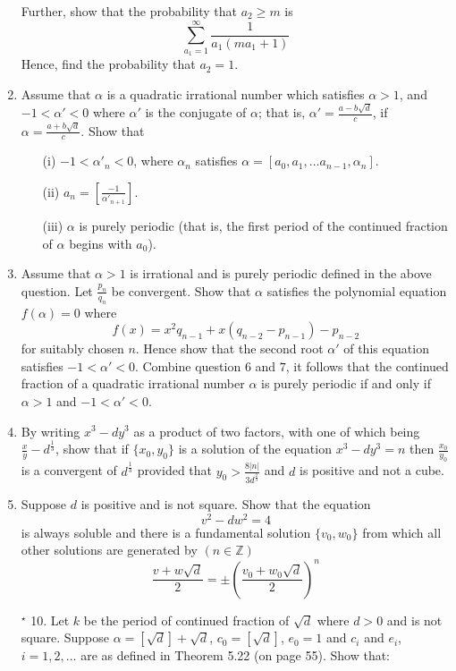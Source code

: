 \begin{enumerate}
     Further, show that the probability that $a_2 \ge m$ is
     $$\sum_{a_1=1}^{\infty} \frac{1}{a_1(ma_1+1)}$$
     Hence, find the probability that $a_2=1$.
\item Assume that $\alpha$ is a quadratic irrational number which satisfies $\alpha>1$, and
     $-1<\alpha'<0$ where $\alpha'$ is the conjugate of $\alpha$; that is, $\alpha'=\frac{a-b\sqrt{d}}{c}$, if $\alpha=\frac{a+b\sqrt{d}}{c}$. Show that
     \begin{enumerate}
     \item[(i)] $-1<\alpha'_{n}<0$, where $\alpha_n$ satisfies
     $\alpha=[a_0,a_1,\ldots a_{n-1},\alpha_n]$.
     \item[(ii)] $a_n=[\frac{-1}{\alpha'_{n+1}}]$.
     \item[(iii)] $\alpha$ is purely periodic (that is, the first period of the continued fraction of $\alpha$ begins with $a_0$).
     \end{enumerate}
\item Assume that $\alpha>1$ is irrational and is purely periodic defined in the above question.
     Let $\frac{p_n}{q_n}$ be convergent.
     Show that $\alpha$ satisfies the polynomial equation $f(\alpha)=0$ where
     $$f(x)=x^2q_{n-1}+x(q_{n-2}-p_{n-1})-p_{n-2}$$
     for suitably chosen $n$. Hence show that the second root $\alpha'$ of this equation
     satisfies $-1<\alpha'<0$.
     Combine question $6$ and $7$, it follows that the continued fraction of a quadratic irrational
     number $\alpha$ is purely periodic if and only if $\alpha>1$ and $-1<\alpha'<0$.
\item By writing $x^3-dy^3$ as a product of two factors, with one of which being
     $\frac{x}{y}-d^{\frac{1}{3}}$, show that if $\{x_0,y_0\}$ is a solution of the equation
     $x^3-dy^3=n$ then $\frac{x_0}{y_0}$ is a convergent of $d^{\frac{1}{3}}$ provided that
     $y_0 > \frac{8|n|}{3d^{\frac{2}{3}}}$ and $d$ is positive and not a cube.
\item Suppose $d$ is positive and is not square. Show that the equation
     $$v^2-dw^2=4$$
     is always soluble and there is a fundamental solution $\{v_0,w_0\}$ from which all other solutions are generated by $(n \in \mathbb{Z})$
     $$\frac{v+w\sqrt{d}}{2}=\pm \left(\frac{v_0+w_0\sqrt{d}}{2}\right)^n$$
\item[$^\star$ 10.] Let $k$ be the period of continued fraction of $\sqrt{d}$ where $d>0$ and is not square. Suppose $\alpha=[\sqrt{d}]+\sqrt{d}$, $c_0=[\sqrt{d}]$, $e_0=1$ and $c_i$ and $e_i$, $i=1,2,\ldots$ are as defined in Theorem 5.22 (on page 55). Show that:

\end{enumerate}
